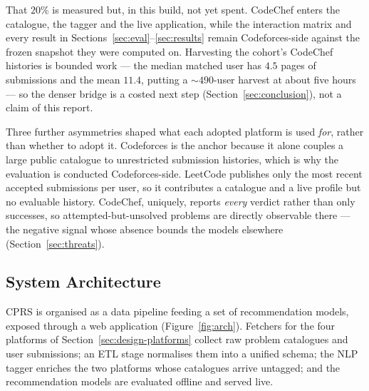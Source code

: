 \documentclass[12pt,a4paper]{article}
\begin{document}
That $20\%$ is measured but, in this build, not yet spent. CodeChef enters the catalogue,
the tagger and the live application, while the interaction matrix and every result in
Sections~\ref{sec:eval}--\ref{sec:results} remain Codeforces-side against the frozen
snapshot they were computed on. Harvesting the cohort's CodeChef histories is bounded
work --- the median matched user has $4.5$ pages of submissions and the mean $11.4$,
putting a $\sim$$490$-user harvest at about five hours --- so the denser bridge is a
costed next step (Section~\ref{sec:conclusion}), not a claim of this report.

Three further asymmetries shaped what each adopted platform is used \emph{for}, rather
than whether to adopt it. Codeforces is the anchor because it alone couples a large
public catalogue to unrestricted submission histories, which is why the evaluation is
conducted Codeforces-side. LeetCode publishes only the most recent accepted submissions
per user, so it contributes a catalogue and a live profile but no evaluable history.
CodeChef, uniquely, reports \emph{every} verdict rather than only successes, so
attempted-but-unsolved problems are directly observable there --- the negative signal
whose absence bounds the models elsewhere (Section~\ref{sec:threats}).

\subsection{System Architecture}
CPRS is organised as a data pipeline feeding a set of recommendation models, exposed
through a web application (Figure~\ref{fig:arch}). Fetchers for the four platforms of
Section~\ref{sec:design-platforms} collect raw problem
catalogues and user submissions; an ETL stage normalises them into a unified schema; the
NLP tagger enriches the two platforms whose catalogues arrive untagged; and the
recommendation models are evaluated offline and served live.
\end{document}
